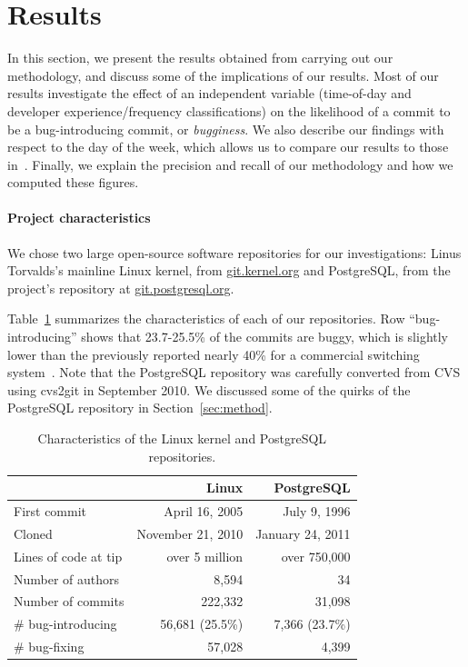 \section{Results}
\label{sec-results}
In this section, we present the results obtained from carrying out our
methodology, and discuss some of the implications of our results.
Most of our results investigate the effect of an independent variable
(time-of-day and developer experience/frequency classifications) on
the likelihood of a commit to be a bug-introducing commit, or
\emph{bugginess}. We also
describe our findings with respect to the day of the week, which
allows us to compare our results to those
in~\cite{sliwerski-msr-2005}.  Finally, we explain the precision and
recall of our methodology and how we computed these figures.

\paragraph{Project characteristics}
We chose two large open-source software repositories for our
investigations: Linus Torvalds's mainline Linux kernel, from
\url{git.kernel.org} and PostgreSQL, from the project's repository at
\url{git.postgresql.org}. 


Table~\ref{tab:characteristics} summarizes
the characteristics of each of our repositories. 
Row ``bug-introducing'' shows that 23.7-25.5\% of the commits are buggy, which 
is slightly lower than the previously reported nearly 40\% for a commercial switching system~\cite{smallCommits05}. 
Note that the
PostgreSQL repository was carefully converted from CVS using {\code cvs2git} in
September 2010. We discussed some of the quirks of the PostgreSQL repository
in Section~\ref{sec:method}.


\begin{table}
\begin{tabular}{l|r|r}
& {\bf Linux} & {\bf PostgreSQL} \\ \hline
First commit & April 16, 2005 & July 9, 1996 \\
Cloned & November 21, 2010 & January 24, 2011 \\
Lines of code at tip & over 5 million & over 750,000 \\
Number of authors & 8,594 & 34 \\
Number of commits & 222,332 & 31,098 \\
\# bug-introducing & 56,681 (25.5\%) & 7,366 (23.7\%) \\
\# bug-fixing & 57,028 & 4,399
\end{tabular}
\caption{\label{tab:characteristics}Characteristics of the Linux kernel and PostgreSQL repositories.}
\end{table}

